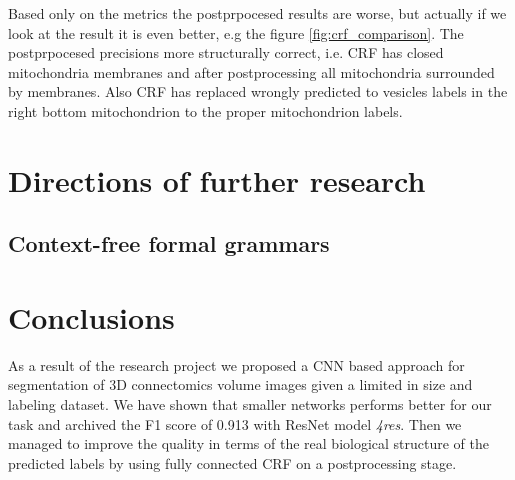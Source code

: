\documentclass[twocolumn, a4paper]{article}
\theoremstyle{definition}
\begin{document}
Based only on the metrics the postprpocesed results are worse, but actually if we look at the result it is even better,
e.g the figure \ref{fig:crf_comparison}. The postprpocesed precisions more structurally correct, i.e. CRF has closed mitochondria
membranes and after postprocessing all mitochondria surrounded by membranes. Also CRF has replaced wrongly predicted
to vesicles labels in the right bottom mitochondrion to the proper mitochondrion labels.

\section{Directions of further research}
\subsection{Context-free formal grammars}

\section{Conclusions}
As a result of the research project we proposed a CNN based approach for segmentation of 3D
connectomics volume images given a limited in size and labeling dataset.
We have shown that smaller networks performs better for our task and archived
the F1 score of 0.913 with ResNet model \textit{4res}. Then we managed to improve the quality in terms
of the real biological structure of the predicted labels by using
fully connected CRF on a postprocessing stage.




\end{document}
